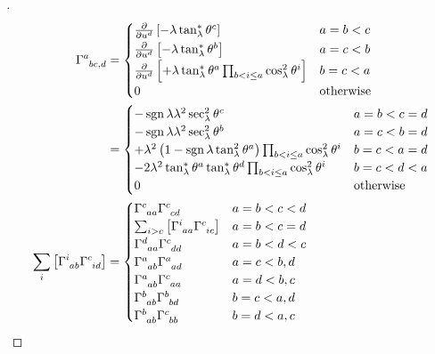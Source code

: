 \documentclass[../main.tex]{subfiles}
\begin{document}
\begin{proof}[]
\begin{align*}
\tensor{\Gamma}{^a_b_c_{,d}}
&=\begin{cases}
\frac{\partial}{\partial\tensor{u}{^d}}\left[-\lambda\tan_\lambda^\ast\tensor{\theta}{^c}\right]&\text{\(a=b<c\)}\\
\frac{\partial}{\partial\tensor{u}{^d}}\left[-\lambda\tan_\lambda^\ast\tensor{\theta}{^b}\right]&\text{\(a=c<b\)}\\
\frac{\partial}{\partial\tensor{u}{^d}}\left[+\lambda\tan_\lambda^\ast\tensor{\theta}{^a}\prod_{b<i\le a}{\cos_\lambda^2\tensor{\theta}{^i}}\right]&\text{\(b=c<a\)}\\
0&\text{otherwise}\\
\end{cases}\\
&=\begin{cases}
-\sign{\lambda}\lambda^2\sec_\lambda^2\tensor{\theta}{^c}&\text{\(a=b<c=d\)}\\
-\sign{\lambda}\lambda^2\sec_\lambda^2\tensor{\theta}{^b}&\text{\(a=c<b=d\)}\\
+\lambda^2\left(1-\sign{\lambda}\tan_\lambda^2\tensor{\theta}{^a}\right)\prod_{b<i\le a}{\cos_\lambda^2\tensor{\theta}{^i}}&\text{\(b=c<a=d\)}\\
-2\lambda^2\tan_\lambda^\ast\tensor{\theta}{^a}\tan_\lambda^\ast\tensor{\theta}{^d}\prod_{b<i\le a}{\cos_\lambda^2\tensor{\theta}{^i}}&\text{\(b=c<d<a\)}\\
0&\text{otherwise}\\
\end{cases}\\
\sum_{i}\left[\tensor{\Gamma}{^i_a_b}\tensor{\Gamma}{^c_i_d}\right]
&=\begin{cases}
\tensor{\Gamma}{^c_a_a}\tensor{\Gamma}{^c_c_d}&\text{\(a=b<c<d\)}\\
\sum_{i>c}\left[\tensor{\Gamma}{^i_a_a}\tensor{\Gamma}{^c_i_c}\right]&\text{\(a=b<c=d\)}\\
\tensor{\Gamma}{^d_a_a}\tensor{\Gamma}{^c_d_d}&\text{\(a=b<d<c\)}\\
\tensor{\Gamma}{^a_a_b}\tensor{\Gamma}{^a_a_d}&\text{\(a=c<b,d\)}\\
\tensor{\Gamma}{^a_a_b}\tensor{\Gamma}{^c_a_a}&\text{\(a=d<b,c\)}\\
\tensor{\Gamma}{^b_a_b}\tensor{\Gamma}{^b_b_d}&\text{\(b=c<a,d\)}\\
\tensor{\Gamma}{^b_a_b}\tensor{\Gamma}{^c_b_b}&\text{\(b=d<a,c\)}\\

\end{cases}
\end{align*}
\end{proof}
\end{document}
